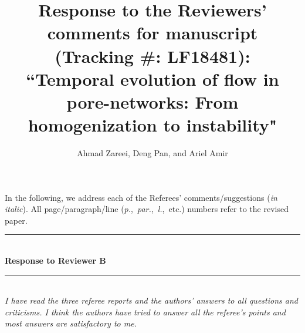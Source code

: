 \documentclass{article}
\title{
Response to the Reviewers' comments for manuscript \\
(Tracking \#: LF18481): \\
``Temporal evolution of flow in pore-networks: From homogenization to instability"
}
\author{Ahmad Zareei, Deng Pan, and  Ariel Amir
}
\date{}
\newcommand{\Hline}{\rule{\linewidth}{.1mm}}
\newcommand{\Question}[1]{\noindent \color{black}\emph{#1}\normalcolor}
\newcommand{\Answer}[1]{\noindent {\color{blue}{ #1}}\normalcolor}
\begin{document}
\maketitle

\noindent In the following, we address each of the Referees' comments/suggestions (\emph{in italic}). All page/paragraph/line (\textit{p.},\ \textit{par.},\ \textit{l.},\ etc.) numbers refer to the revised paper. %

\vspace{5 mm}
\noindent
\Hline \\
\textbf{Response to Reviewer B} \\
\Hline
\\


\Question{I have read the three referee reports
and the authors' answers to all questions and criticisms. I think the
authors have tried to answer all the referee's points and most answers
are satisfactory to me.}

\vspace{0.3 cm}

\Answer{We appreciate the referee's thorough reviews.}
\vspace{0.3 cm}
\end{document}
